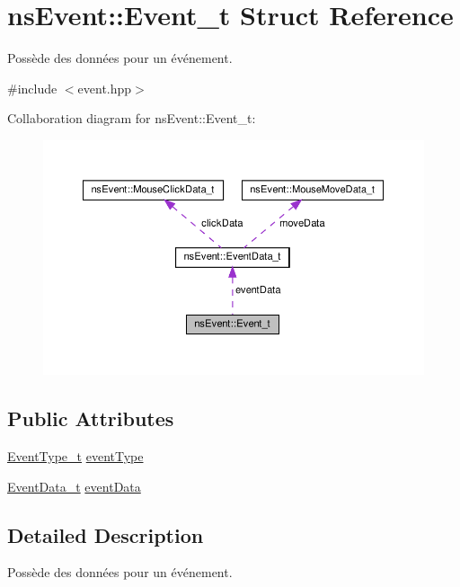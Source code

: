 \hypertarget{structns_event_1_1_event__t}{}\section{ns\+Event\+:\+:Event\+\_\+t Struct Reference}
\label{structns_event_1_1_event__t}


Possède des données pour un événement.  




{\ttfamily \#include $<$event.\+hpp$>$}



Collaboration diagram for ns\+Event\+:\+:Event\+\_\+t\+:
\nopagebreak
\begin{figure}[H]
\begin{center}
\leavevmode
\includegraphics[width=350pt]{structns_event_1_1_event__t__coll__graph}
\end{center}
\end{figure}
\subsection*{Public Attributes}
\begin{DoxyCompactItemize}
\item 
\hyperlink{namespacens_event_a6e501b1114a041d127a56f51c66ada72}{Event\+Type\+\_\+t} \hyperlink{structns_event_1_1_event__t_a4658fcb9ee305cae39da30840d64192c}{event\+Type}
\item 
\hyperlink{unionns_event_1_1_event_data__t}{Event\+Data\+\_\+t} \hyperlink{structns_event_1_1_event__t_a148669454c11351db2ac902aad495ac8}{event\+Data}
\end{DoxyCompactItemize}


\subsection{Detailed Description}
Possède des données pour un événement. 


